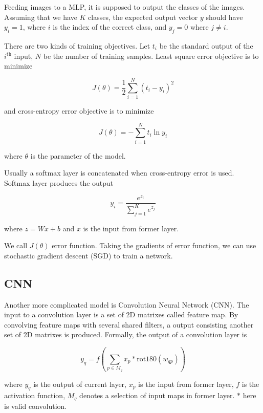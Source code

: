 \documentclass{article} %
\begin{document}
Feeding images to a MLP, it is supposed to output the classes of the images. Assuming that we have $K$ classes, the expected output vector $y$ should have $y_i=1$, where $i$ is the index of the correct class, and $y_j=0$ where $j\neq i$. 

There are two kinds of training objectives. Let $t_i$ be the standard output of the $i^{\mbox{th}}$ input, $N$ be the number of training samples. Least square error objective is to minimize

\begin{equation}
J(\theta)=\frac{1}{2}\sum_{i=1}^N (t_i-y_i)^2
\end{equation}

and cross-entropy error objective is to minimize

\begin{equation}
J(\theta)=-\sum_{i=1}^N t_i \ln{y_i}
\end{equation}

where $\theta$ is the parameter of the model.

Usually a softmax layer is concatenated when cross-entropy error is used. Softmax layer produces the output

\begin{equation}
y_i=\frac{e^{z_i}}{\sum_{j=1}^K e^{z_j}}
\end{equation}

where $z=Wx+b$ and $x$ is the input from former layer.

We call $J(\theta)$ error function. Taking the gradients of error function, we can use stochastic gradient descent (SGD) to train a network.

\subsection{CNN}

Another more complicated model is Convolution Neural Network (CNN). The input to a convolution layer is a set of 2D matrixes called feature map. By convolving feature maps with several shared filters, a output consisting another set of 2D matrixes is produced. Formally, the output of a convolution layer is

\begin{equation}
	y_q = f(\sum_{p \in {M_q}} x_p * \mbox{rot180}(w_{qp}))
\end{equation}

where $y_q$ is the output of current layer, $x_p$ is the input from former layer, $f$ is the activation function, $M_q$ denotes a selection of input maps in former layer. $*$ here is valid convolution.
\end{document}
